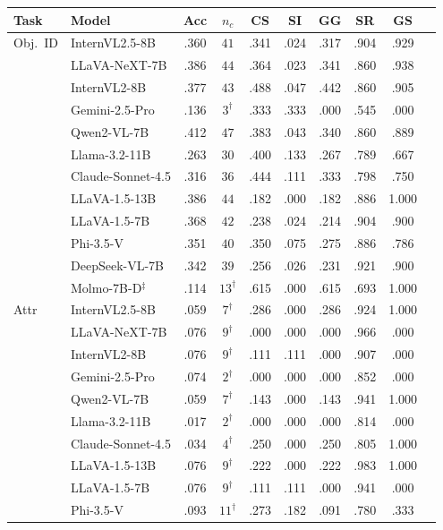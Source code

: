 \begin{tabular}{@{}llcccccccc@{}}
\toprule
Task & Model & Acc & $n_c$ & CS & SI & GG & SR & GS \\
\midrule
Obj.\ ID & InternVL2.5-8B & .360 & $41$ & .341 & .024 & .317 & .904 & .929 \\
 & LLaVA-NeXT-7B & .386 & $44$ & .364 & .023 & .341 & .860 & .938 \\
 & InternVL2-8B & .377 & $43$ & .488 & .047 & .442 & .860 & .905 \\
 & Gemini-2.5-Pro & .136 & $3^\dagger$ & .333 & .333 & .000 & .545 & .000 \\
 & Qwen2-VL-7B & .412 & $47$ & .383 & .043 & .340 & .860 & .889 \\
 & Llama-3.2-11B & .263 & $30$ & .400 & .133 & .267 & .789 & .667 \\
 & Claude-Sonnet-4.5 & .316 & $36$ & .444 & .111 & .333 & .798 & .750 \\
 & LLaVA-1.5-13B & .386 & $44$ & .182 & .000 & .182 & .886 & 1.000 \\
 & LLaVA-1.5-7B & .368 & $42$ & .238 & .024 & .214 & .904 & .900 \\
 & Phi-3.5-V & .351 & $40$ & .350 & .075 & .275 & .886 & .786 \\
 & DeepSeek-VL-7B & .342 & $39$ & .256 & .026 & .231 & .921 & .900 \\
 & Molmo-7B-D$^\ddagger$ & .114 & $13^\dagger$ & .615 & .000 & .615 & .693 & 1.000 \\
\midrule
Attr & InternVL2.5-8B & .059 & $7^\dagger$ & .286 & .000 & .286 & .924 & 1.000 \\
 & LLaVA-NeXT-7B & .076 & $9^\dagger$ & .000 & .000 & .000 & .966 & .000 \\
 & InternVL2-8B & .076 & $9^\dagger$ & .111 & .111 & .000 & .907 & .000 \\
 & Gemini-2.5-Pro & .074 & $2^\dagger$ & .000 & .000 & .000 & .852 & .000 \\
 & Qwen2-VL-7B & .059 & $7^\dagger$ & .143 & .000 & .143 & .941 & 1.000 \\
 & Llama-3.2-11B & .017 & $2^\dagger$ & .000 & .000 & .000 & .814 & .000 \\
 & Claude-Sonnet-4.5 & .034 & $4^\dagger$ & .250 & .000 & .250 & .805 & 1.000 \\
 & LLaVA-1.5-13B & .076 & $9^\dagger$ & .222 & .000 & .222 & .983 & 1.000 \\
 & LLaVA-1.5-7B & .076 & $9^\dagger$ & .111 & .111 & .000 & .941 & .000 \\
 & Phi-3.5-V & .093 & $11^\dagger$ & .273 & .182 & .091 & .780 & .333 \\

\end{tabular}
